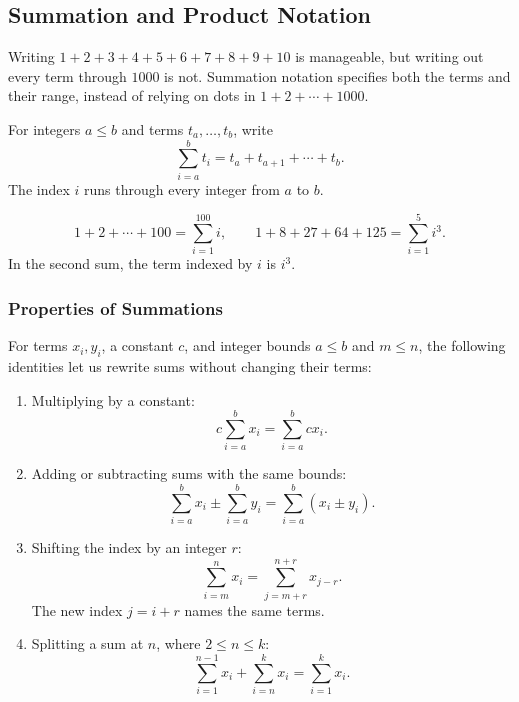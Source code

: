 \subsection{Summation and Product Notation}
Writing $1+2+3+4+5+6+7+8+9+10$ is manageable, but writing out every term
through $1000$ is not. Summation notation specifies both the terms and their
range, instead of relying on dots in $1+2+\cdots+1000$.

\begin{definition}
    For integers $a\leq b$ and terms $t_a,\ldots,t_b$, write
    \begin{equation*}
        \sum_{i=a}^{b}t_i=t_a+t_{a+1}+\cdots+t_b.
    \end{equation*}
    The index $i$ runs through every integer from $a$ to $b$.
\end{definition}

\begin{example}
    \begin{equation*}
        1+2+\cdots+100=\sum_{i=1}^{100}i,
        \qquad
        1+8+27+64+125=\sum_{i=1}^{5}i^3.
    \end{equation*}
    In the second sum, the term indexed by $i$ is $i^3$.
\end{example}

\subsubsection{Properties of Summations}
For terms $x_i,y_i$, a constant $c$, and integer bounds $a\leq b$ and
$m\leq n$, the following identities let us rewrite sums without changing
their terms:
\begin{enumerate}
    \item Multiplying by a constant:
    \begin{equation*}
        c\sum_{i=a}^{b}x_i=\sum_{i=a}^{b}cx_i.
    \end{equation*}
    \item Adding or subtracting sums with the same bounds:
    \begin{equation*}
        \sum_{i=a}^{b}x_i\pm\sum_{i=a}^{b}y_i
        =\sum_{i=a}^{b}(x_i\pm y_i).
    \end{equation*}
    \item Shifting the index by an integer $r$:
    \begin{equation*}
        \sum_{i=m}^{n}x_i=\sum_{j=m+r}^{n+r}x_{j-r}.
    \end{equation*}
    The new index $j=i+r$ names the same terms.
    \item Splitting a sum at $n$, where $2\leq n\leq k$:
    \begin{equation*}
        \sum_{i=1}^{n-1}x_i+\sum_{i=n}^{k}x_i=\sum_{i=1}^{k}x_i.
    \end{equation*}
\end{enumerate}

